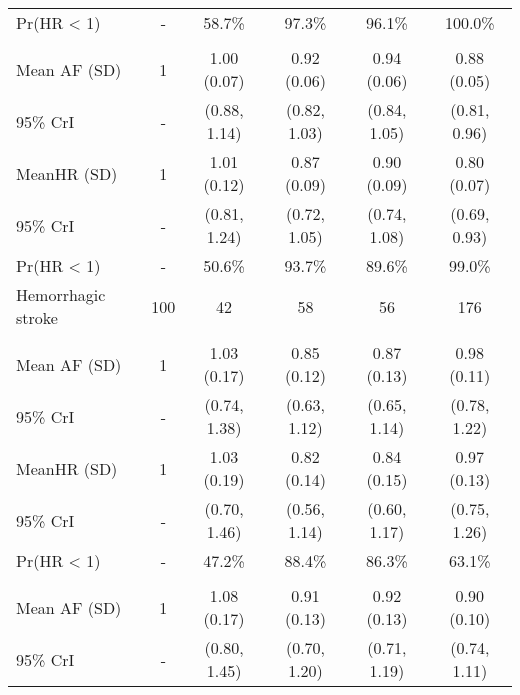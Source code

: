 \documentclass[nutrients,article,submit,moreauthors,pdftex]{mdpi}
\begin{document}
\begin{table}[!h]
{\begin{tabular}[t]{lccccc}
\rowcolor{gray!6}  \hspace{1em}Pr(HR < 1) & - & 58.7\% & 97.3\% & 96.1\% & 100.0\%\\
\addlinespace[0.3em]
\multicolumn{6}{l}{\textbf{Model 2}}\\
\hspace{1em}Mean AF (SD) & 1 & 1.00 (0.07) & 0.92 (0.06) & 0.94 (0.06) & 0.88 (0.05)\\
\rowcolor{gray!6}  \hspace{1em}95\% CrI & - & (0.88, 1.14) & (0.82, 1.03) & (0.84, 1.05) & (0.81, 0.96)\\
\hspace{1em}MeanHR (SD) & 1 & 1.01 (0.12) & 0.87 (0.09) & 0.90 (0.09) & 0.80 (0.07)\\
\rowcolor{gray!6}  \hspace{1em}95\% CrI & - & (0.81, 1.24) & (0.72, 1.05) & (0.74, 1.08) & (0.69, 0.93)\\
\hspace{1em}Pr(HR < 1) & - & 50.6\% & 93.7\% & 89.6\% & 99.0\%\\
\hline
\rowcolor{gray!6}  Hemorrhagic stroke & 100 & 42 & 58 & 56 & 176\\
\addlinespace[0.3em]
\multicolumn{6}{l}{\textbf{Model 0}}\\
\hspace{1em}Mean AF (SD) & 1 & 1.03 (0.17) & 0.85 (0.12) & 0.87 (0.13) & 0.98 (0.11)\\
\rowcolor{gray!6}  \hspace{1em}95\% CrI & - & (0.74, 1.38) & (0.63, 1.12) & (0.65, 1.14) & (0.78, 1.22)\\
\hspace{1em}MeanHR (SD) & 1 & 1.03 (0.19) & 0.82 (0.14) & 0.84 (0.15) & 0.97 (0.13)\\
\rowcolor{gray!6}  \hspace{1em}95\% CrI & - & (0.70, 1.46) & (0.56, 1.14) & (0.60, 1.17) & (0.75, 1.26)\\
\hspace{1em}Pr(HR < 1) & - & 47.2\% & 88.4\% & 86.3\% & 63.1\%\\
\addlinespace[0.3em]
\multicolumn{6}{l}{\textbf{Model 1}}\\
\rowcolor{gray!6}  \hspace{1em}Mean AF (SD) & 1 & 1.08 (0.17) & 0.91 (0.13) & 0.92 (0.13) & 0.90 (0.10)\\
\hspace{1em}95\% CrI & - & (0.80, 1.45) & (0.70, 1.20) & (0.71, 1.19) & (0.74, 1.11)\\

\end{tabular}}
\end{table}
\end{document}
